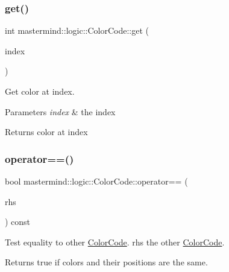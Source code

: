 \subsubsection{\texorpdfstring{get()}{get()}}
{\footnotesize\ttfamily int mastermind\+::logic\+::\+Color\+Code\+::get (\begin{DoxyParamCaption}\item[{std\+::size\+\_\+t}]{index }\end{DoxyParamCaption})}



Get color at index. 


\begin{DoxyParams}{Parameters}
{\em index} & the index \\
\hline
\end{DoxyParams}
\begin{DoxyReturn}{Returns}
color at index 
\end{DoxyReturn}
\hypertarget{classmastermind_1_1logic_1_1_color_code_a2bb0b3f30f7a353348a7b73da5b47e19}{}\label{classmastermind_1_1logic_1_1_color_code_a2bb0b3f30f7a353348a7b73da5b47e19} 
\subsubsection{\texorpdfstring{operator==()}{operator==()}}
{\footnotesize\ttfamily bool mastermind\+::logic\+::\+Color\+Code\+::operator== (\begin{DoxyParamCaption}\item[{const \hyperlink{classmastermind_1_1logic_1_1_color_code}{Color\+Code} \&}]{rhs }\end{DoxyParamCaption}) const}



Test equality to other \hyperlink{classmastermind_1_1logic_1_1_color_code}{Color\+Code}.  rhs the other \hyperlink{classmastermind_1_1logic_1_1_color_code}{Color\+Code}. 

\begin{DoxyReturn}{Returns}
{\ttfamily true} if colors and their positions are the same. 
\end{DoxyReturn}
\hypertarget{classmastermind_1_1logic_1_1_color_code_addfc2314a5fcc2783edd0b6c6a70a4cc}{}\label{classmastermind_1_1logic_1_1_color_code_addfc2314a5fcc2783edd0b6c6a70a4cc} 
